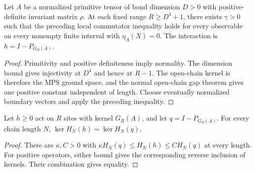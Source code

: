 \begin{lemma}
    \label{thm:primitive_local_commutator_wielandt}
    \leanok
    Let $A$ be a normalized primitive tensor of bond dimension $D>0$ with
    positive-definite invariant matrix $\rho$. At each fixed range
    $R\geq D^4+1$, there exists $\gamma>0$ such that the preceding local
    commutator inequality holds for every observable on every nonempty
    finite interval with $\eta_A(X)=0$.
    The interaction is $h=I-P_{G_R(A)}$.
\end{lemma}
\begin{proof}\leanok
    Primitivity and positive definiteness imply normality.
    The dimension bound gives injectivity at $D^4$ and hence at $R-1$.
    The open-chain kernel is therefore the MPS ground space, and the normal
    open-chain gap theorem gives one positive constant independent of
    length. Choose eventually normalized boundary vectors and apply the
    preceding inequality.
\end{proof}

\begin{lemma}
    \label{thm:open_parent_interaction_kernel_equal}
    \leanok
    Let $h\geq0$ act on $R$ sites with kernel $G_R(A)$, and let
    $q=I-P_{G_R(A)}$. For every chain length $N$,
    $\ker H_N(h)=\ker H_N(q)$.
\end{lemma}
\begin{proof}\leanok
    There are $\kappa,C>0$ with
    $\kappa H_N(q)\leq H_N(h)\leq C H_N(q)$ at every length.
    For positive operators, either bound gives the corresponding reverse
    inclusion of kernels. Their combination gives equality.
\end{proof}


